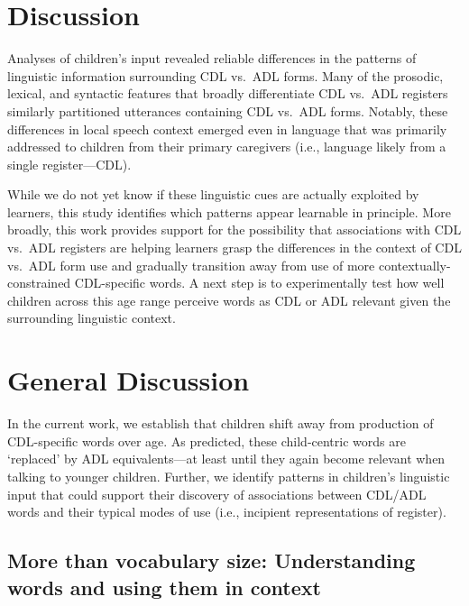 \documentclass[10pt, letterpaper]{article}
\begin{document}
\hypertarget{discussion-1}{%
\section{Discussion}\label{discussion-1}}

Analyses of children's input revealed reliable differences in the
patterns of linguistic information surrounding CDL vs.~ADL forms. Many
of the prosodic, lexical, and syntactic features that broadly
differentiate CDL vs.~ADL registers similarly partitioned utterances
containing CDL vs.~ADL forms. Notably, these differences in local speech
context emerged even in language that was primarily addressed to
children from their primary caregivers (i.e., language likely from a
single register---CDL).

While we do not yet know if these linguistic cues are actually exploited
by learners, this study identifies which patterns appear learnable in
principle. More broadly, this work provides support for the possibility
that associations with CDL vs.~ADL registers are helping learners grasp
the differences in the context of CDL vs.~ADL form use and gradually
transition away from use of more contextually-constrained CDL-specific
words. A next step is to experimentally test how well children across
this age range perceive words as CDL or ADL relevant given the
surrounding linguistic context.

\hypertarget{general-discussion}{%
\section{General Discussion}\label{general-discussion}}

In the current work, we establish that children shift away from
production of CDL-specific words over age. As predicted, these
child-centric words are `replaced' by ADL equivalents---at least until
they again become relevant when talking to younger children. Further, we
identify patterns in children's linguistic input that could support
their discovery of associations between CDL/ADL words and their typical
modes of use (i.e., incipient representations of register).

\hypertarget{more-than-vocabulary-size-understanding-words-and-using-them-in-context}{%
\subsection{More than vocabulary size: Understanding words and using
them in
context}\label{more-than-vocabulary-size-understanding-words-and-using-them-in-context}}
\end{document}
